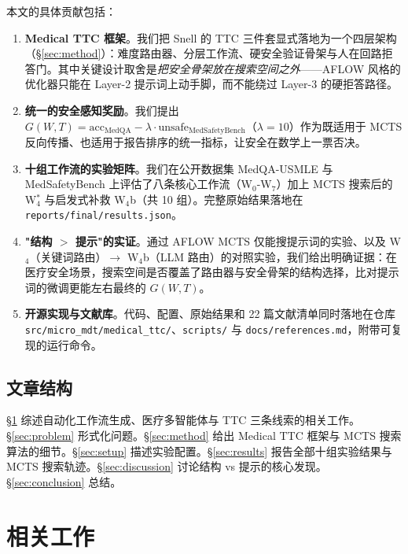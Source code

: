 \documentclass[11pt,a4paper]{ctexart}
\newcommand{\acc}{\mathrm{acc}}
\newcommand{\unsafe}{\mathrm{unsafe}}
\begin{document}
本文的具体贡献包括：

\begin{enumerate}
    \item \textbf{Medical TTC 框架}。我们把 Snell 的 TTC 三件套显式落地为一个四层架构（\S\ref{sec:method}）：难度路由器、分层工作流、硬安全验证骨架与人在回路拒答门。其中关键设计取舍是\emph{把安全骨架放在搜索空间之外}——AFLOW 风格的优化器只能在 Layer-2 提示词上动手脚，而不能绕过 Layer-3 的硬拒答路径。
    \item \textbf{统一的安全感知奖励}。我们提出 $G(W,T) = \acc_{\text{MedQA}} - \lambda \cdot \unsafe_{\text{MedSafetyBench}}$（$\lambda=10$）作为既适用于 MCTS 反向传播、也适用于报告排序的统一指标，让安全在数学上一票否决。
    \item \textbf{十组工作流的实验矩阵}。我们在公开数据集 MedQA-USMLE \cite{medqa2020} 与 MedSafetyBench \cite{medsafetybench2024} 上评估了八条核心工作流（W$_0$-W$_7$）加上 MCTS 搜索后的 W$_4^*$ 与启发式补救 W$_4$b（共 10 组）。完整原始结果落地在 \texttt{reports/final/results.json}。
    \item \textbf{"结构 $>$ 提示"的实证}。通过 AFLOW MCTS 仅能搜提示词的实验、以及 W$_4$（关键词路由）$\to$ W$_4$b（LLM 路由）的对照实验，我们给出明确证据：在医疗安全场景，搜索空间是否覆盖了路由器与安全骨架的结构选择，比对提示词的微调更能左右最终的 $G(W,T)$。
    \item \textbf{开源实现与文献库}。代码、配置、原始结果和 22 篇文献清单同时落地在仓库 \texttt{src/micro\_mdt/medical\_ttc/}、\texttt{scripts/} 与 \texttt{docs/references.md}，附带可复现的运行命令。
\end{enumerate}

\subsection{文章结构}

\S\ref{sec:related} 综述自动化工作流生成、医疗多智能体与 TTC 三条线索的相关工作。\S\ref{sec:problem} 形式化问题。\S\ref{sec:method} 给出 Medical TTC 框架与 MCTS 搜索算法的细节。\S\ref{sec:setup} 描述实验配置。\S\ref{sec:results} 报告全部十组实验结果与 MCTS 搜索轨迹。\S\ref{sec:discussion} 讨论结构 vs 提示的核心发现。\S\ref{sec:conclusion} 总结。

\section{相关工作}
\label{sec:related}
\end{document}
